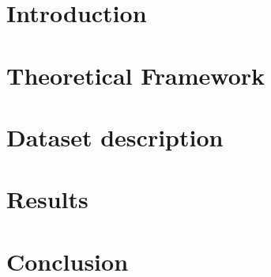\documentclass[12pt,%
               a4paper,%
               oneside,openany,%
               titlepage,%
               headinclude,footinclude,%
               BCOR5mm,%
               cleardoublepage=empty,%
               tablecaptionabove,%
               floatperchapter,
               ]{scrreprt}                 %
\begin{document}
\newpage

\chapter{Introduction}

\chapter{Theoretical Framework}

\chapter{Dataset description}

\chapter{Results}

\chapter{Conclusion}





\newpage




\end{document}
